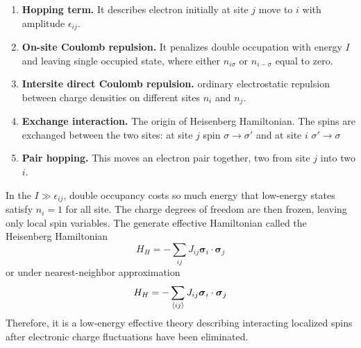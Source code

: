 \documentclass[../../../main.tex]{subfiles}
\begin{document}
\begin{enumerate}
    \item \textbf{Hopping term.} It describes electron initially at site $j$ move to  $i$ with amplitude $\epsilon_{ij}$.
    \item \textbf{On-site Coulomb repulsion.} It penalizes double occupation with energy $I$ and leaving single occupied state, where either $n_{i\sigma}$ or $n_{i-\sigma}$ equal to zero.
    \item \textbf{Intersite direct Coulomb repulsion.} ordinary electrostatic repulsion between charge densities on different sites $n_i$ and $n_j$.
    \item \textbf{Exchange interaction.} The origin of Heisenberg Hamiltonian. The spins are exchanged between the two sites: at site $j$ spin $\sigma\to\sigma'$ and at site $i$ $\sigma'\to\sigma$
    \item \textbf{Pair hopping.} This moves an electron pair together, two from site $j$ into two $i$.
\end{enumerate}

In the $I\gg \epsilon_{ij}$, double occupancy costs so much energy that low-energy states satisfy $n_i =1$ for all site.
The charge degrees of freedom are then frozen, leaving only local spin variables.
The generate effective Hamiltonian called the Heisenberg Hamiltonian
\begin{equation*}
    H_H = -\sum_{ij } J_{ij} \boldsymbol{\sigma}_i  \cdot \boldsymbol{\sigma}_j
\end{equation*}
or under nearest-neighbor approximation
\begin{equation*}
    H_H = -\sum_{\braket{ij }} J_{ij} \boldsymbol{\sigma}_i  \cdot \boldsymbol{\sigma}_j
\end{equation*}
Therefore, it is a low-energy effective theory describing interacting localized spins after electronic charge fluctuations have been eliminated.
\end{document}
